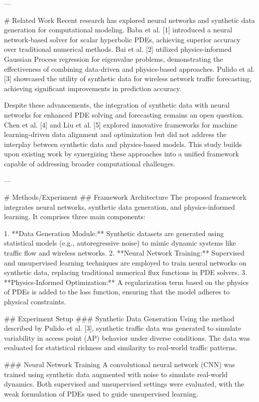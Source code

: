 ---

# Related Work  
Recent research has explored neural networks and synthetic data generation for computational modeling. Baba et al. [1] introduced a neural network-based solver for scalar hyperbolic PDEs, achieving superior accuracy over traditional numerical methods. Bai et al. [2] utilized physics-informed Gaussian Process regression for eigenvalue problems, demonstrating the effectiveness of combining data-driven and physics-based approaches. Pulido et al. [3] showcased the utility of synthetic data for wireless network traffic forecasting, achieving significant improvements in prediction accuracy.

Despite these advancements, the integration of synthetic data with neural networks for enhanced PDE solving and forecasting remains an open question. Chen et al. [4] and Liu et al. [5] explored innovative frameworks for machine learning-driven data alignment and optimization but did not address the interplay between synthetic data and physics-based models. This study builds upon existing work by synergizing these approaches into a unified framework capable of addressing broader computational challenges.

---

# Methods/Experiment  
## Framework Architecture  
The proposed framework integrates neural networks, synthetic data generation, and physics-informed learning. It comprises three main components:

1. **Data Generation Module:** Synthetic datasets are generated using statistical models (e.g., autoregressive noise) to mimic dynamic systems like traffic flow and wireless networks.
2. **Neural Network Training:** Supervised and unsupervised learning techniques are employed to train neural networks on synthetic data, replacing traditional numerical flux functions in PDE solvers.
3. **Physics-Informed Optimization:** A regularization term based on the physics of PDEs is added to the loss function, ensuring that the model adheres to physical constraints.

## Experiment Setup  
### Synthetic Data Generation  
Using the method described by Pulido et al. [3], synthetic traffic data was generated to simulate variability in access point (AP) behavior under diverse conditions. The data was evaluated for statistical richness and similarity to real-world traffic patterns.

### Neural Network Training  
A convolutional neural network (CNN) was trained using synthetic data augmented with noise to simulate real-world dynamics. Both supervised and unsupervised settings were evaluated, with the weak formulation of PDEs used to guide unsupervised learning.

